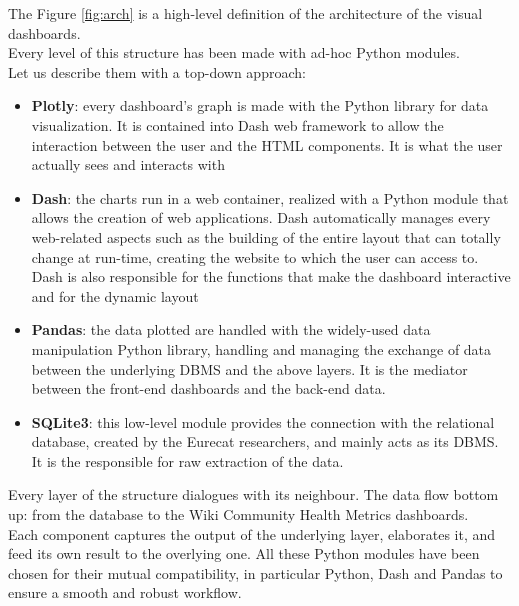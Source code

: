 The Figure \ref{fig:arch} is a high-level definition of the architecture of the visual dashboards. \\
Every level of this structure has been made with ad-hoc Python modules.\\
Let us describe them with a top-down approach:
\begin{itemize}
    \item \textbf{Plotly}: every dashboard's graph is made with the Python library for data visualization. It is contained into Dash web framework to allow the interaction between the user and the HTML components.
    It is what the user actually sees and interacts with
    
    \item \textbf{Dash}: the charts run in a web container, realized with a Python module that allows the creation of web applications. Dash automatically manages every web-related aspects such as the building of the entire layout that can totally change at run-time, creating the website to which the user can access to. \\
    Dash is also responsible for the functions that make the dashboard interactive and for the dynamic layout
    
    \item \textbf{Pandas}: the data plotted are handled with the widely-used data manipulation Python library, handling and managing the exchange of data between the underlying DBMS and the above layers. It is the mediator between the front-end dashboards and the back-end data.
    
    \item \textbf{SQLite3}: this low-level module provides the connection with the relational database, created by the Eurecat researchers, and mainly acts as its DBMS. It is the responsible for raw extraction of the data.
\end{itemize}
Every layer of the structure dialogues with its neighbour.
The data flow bottom up: from the database to the Wiki Community Health Metrics dashboards.\\
Each component captures the output of the underlying layer, elaborates it, and feed its own result to the overlying one.
All these Python modules have been chosen for their mutual compatibility, in particular Python, Dash and Pandas to ensure a smooth and robust workflow.

\space